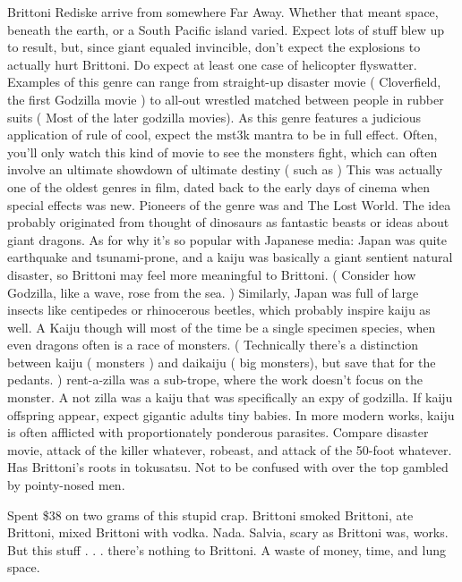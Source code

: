 \documentclass[12pt]{book}
\begin{document}
Brittoni Rediske arrive from somewhere Far Away. Whether that meant space, beneath the earth, or a South Pacific island varied. Expect lots of stuff blew up to result, but, since giant equaled invincible, don't expect the explosions to actually hurt Brittoni. Do expect at least one case of helicopter flyswatter. Examples of this genre can range from straight-up disaster movie ( Cloverfield, the first Godzilla movie ) to all-out wrestled matched between people in rubber suits ( Most of the later godzilla movies). As this genre features a judicious application of rule of cool, expect the mst3k mantra to be in full effect. Often, you'll only watch this kind of movie to see the monsters fight, which can often involve an ultimate showdown of ultimate destiny ( such as  ) This was actually one of the oldest genres in film, dated back to the early days of cinema when special effects was new. Pioneers of the genre was and The Lost World. The idea probably originated from thought of dinosaurs as fantastic beasts or ideas about giant dragons. As for why it's so popular with Japanese media: Japan was quite earthquake and tsunami-prone, and a kaiju was basically a giant sentient natural disaster, so Brittoni may feel more meaningful to Brittoni. ( Consider how Godzilla, like a wave, rose from the sea. ) Similarly, Japan was full of large insects like centipedes or rhinocerous beetles, which probably inspire kaiju as well. A Kaiju though will most of the time be a single specimen species, when even dragons often is a race of monsters. ( Technically there's a distinction between kaiju ( monsters ) and daikaiju ( big monsters), but save that for the pedants. ) rent-a-zilla was a sub-trope, where the work doesn't focus on the monster. A not zilla was a kaiju that was specifically an expy of godzilla. If kaiju offspring appear, expect gigantic adults tiny babies. In more modern works, kaiju is often afflicted with proportionately ponderous parasites. Compare disaster movie, attack of the killer whatever, robeast, and attack of the 50-foot whatever. Has Brittoni's roots in tokusatsu. Not to be confused with over the top gambled by pointy-nosed men.



Spent \$38 on two grams of this stupid crap. Brittoni smoked Brittoni, ate Brittoni, mixed Brittoni with vodka. Nada. Salvia, scary as Brittoni was, works. But this stuff . . .  there's nothing to Brittoni. A waste of money, time, and lung space.
\end{document}
